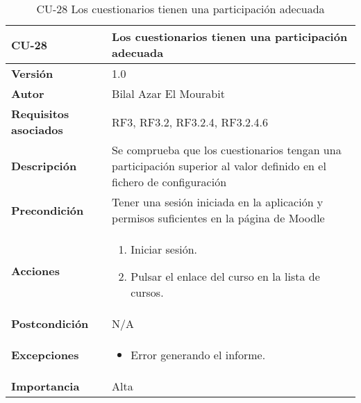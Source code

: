 \begin{table}[H]
	\centering
	\begin{tabularx}{\linewidth}{ p{} p{} }
		\toprule
		\textbf{CU-28}    & \textbf{Los cuestionarios tienen una participación
adecuada}\\
		\toprule
		\textbf{Versión}              & 1.0    \\
		\textbf{Autor}                & Bilal Azar El Mourabit \\
		\textbf{Requisitos asociados} & RF3, RF3.2, RF3.2.4, RF3.2.4.6 \\
		\textbf{Descripción}          & Se comprueba que los cuestionarios tengan una participación superior al valor definido en el fichero de configuración\\
    		\textbf{Precondición}         & Tener una sesión iniciada en la aplicación y permisos suficientes en la página de Moodle\\
		\textbf{Acciones}             & 
		\begin{enumerate}
			\def\labelenumi{\arabic{enumi}.}
			\tightlist
			\item Iniciar sesión.
            \item Pulsar el enlace del curso en la lista de cursos. 
		\end{enumerate}\\
		\textbf{Postcondición}        & N/A \\
		\textbf{Excepciones}          & \begin{itemize}
		    \item Error generando el informe.
		\end{itemize} \\
		\textbf{Importancia}          & Alta \\
		\bottomrule
	\end{tabularx}
	\caption{CU-28 Los cuestionarios tienen una participación
adecuada}
\end{table}

